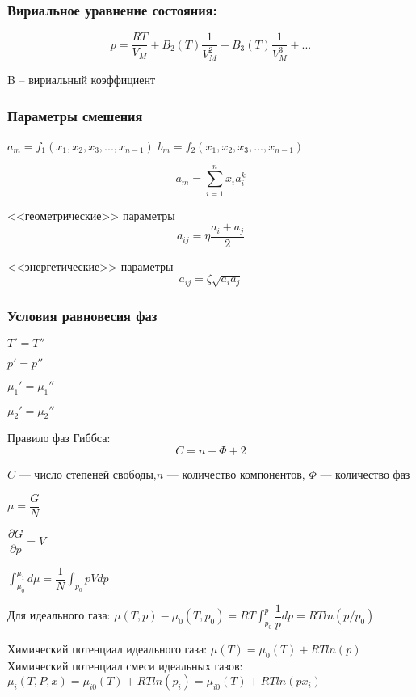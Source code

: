 \begin{frame}
\frametitle{Вириальное уравнение состояния:}
\begin{equation}
	p=\dfrac{RT}{V_M}+ B_2(T) \dfrac{1}{V_M^2}+B_3(T) \dfrac{1}{V_M^3} + ...
\end{equation}

B – вириальный коэффициент
\end{frame}

\begin{frame}
\frametitle{Параметры смешения}
$a_m=f_1(x_1,x_2,x_3,...,x_{n-1})$ \quad
$b_m=f_2(x_1,x_2,x_3,...,x_{n-1})$

\begin{equation}
	a_m=\sum_{i=1}^{n} x_i a_i^k
\end{equation}

<<геометрические>> параметры
\begin{equation}
	a_{ij}=\eta \dfrac{a_i+ a_j}{2}
\end{equation}

<<энергетические>> параметры
\begin{equation}
	a_{ij}=\zeta \sqrt{a_i a_j}
\end{equation}

\end{frame}

\begin{frame}
\frametitle{Условия равновесия фаз}
$T'=T''$

$p'=p''$

$\mu_1'=\mu_1''$

$\mu_2'=\mu_2''$

Правило фаз Гиббса:
\begin{equation}
	C=n-\Phi+2
\end{equation}

$C$ --- число степеней свободы,$ n$ --- количество компонентов, $\Phi$ --- количество фаз
\end{frame}

\begin{frame}
$\mu=\dfrac{G}{N}$

$\dfrac{\partial G}{\partial p} = V$

$\int_{\mu_0}^{\mu_1} d \mu = \dfrac{1}{N} \int_{p_0}{p} V dp $

Для идеального газа:
$\mu( T,p ) -\mu_0( T,p_0 )=RT \int_{p_0}^p \dfrac {1}{p} dp = RT ln( p / p_0 )$

Химический потенциал идеального газа:
$\mu( T ) =\mu_0( T )+ RT ln( p )$
Химический потенциал смеси идеальных газов:
$\mu_i( T,P,x ) =\mu_{i0}( T )+ RT ln( p_i )=\mu_{i0}( T )+ RT ln( p x_i )$
\end{frame}

